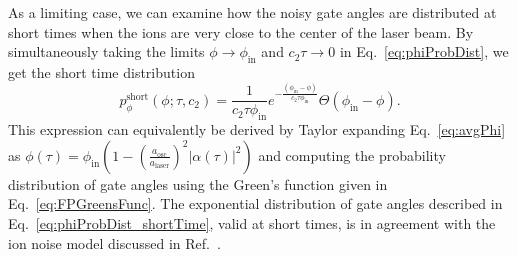 \documentclass[prx,aps,twocolumn,showpacs,superscriptaddress,10pt]{revtex4-1}
\begin{document}
As a limiting case, we can examine how the noisy gate angles are distributed at short times when the ions are very close to the center of the laser beam. By simultaneously taking the limits $\phi\rightarrow\phi_\textrm{in}$ and $c_{2}\tau\rightarrow0$ in Eq.~\eqref{eq:phiProbDist}, we get the short time distribution
\begin{equation}\label{eq:phiProbDist_shortTime}
	p_{\phi}^\textrm{short}\left(\phi;\tau,c_{2}\right)=\frac{1}{c_{2}\tau\phi_\textrm{in}}e^{-\frac{\left(\phi_\textrm{in}-\phi\right)}{c_{2}\tau\phi_\textrm{in}}}\Theta\left(\phi_\textrm{in}-\phi\right).
\end{equation}
This expression can equivalently be derived by Taylor expanding Eq.~\eqref{eq:avgPhi} as $\phi\left(\tau\right)=\phi_\textrm{in}\left(1-(\frac{a_\textrm{osc}}{a_\textrm{laser}})^{2}\lvert\alpha\left(\tau\right)\rvert^{2}\right)$ and computing the probability distribution of gate angles using the Green's function given in Eq.~\eqref{eq:FPGreensFunc}. The exponential distribution of gate angles described in Eq.~\eqref{eq:phiProbDist_shortTime}, valid at short times, is in agreement with the ion noise model discussed in Ref.~\cite{Cetina2020}.
\end{document}
